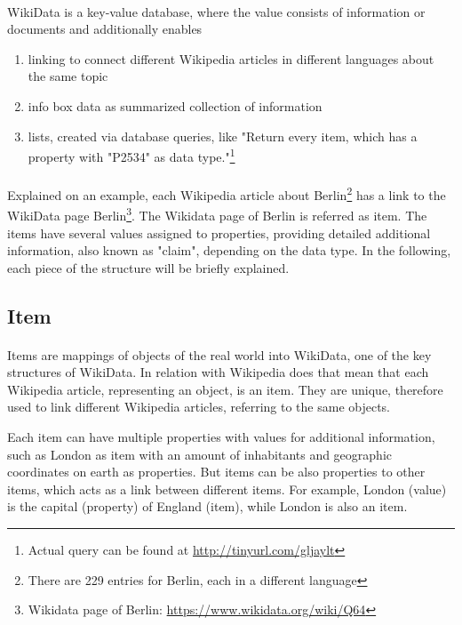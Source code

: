 \documentclass[12pt]{article}
\begin{document}
\paragraph{}
WikiData is a key-value database, where the value consists of information or documents and additionally enables
\begin{enumerate}
\item	linking to connect different Wikipedia articles in different languages about the same topic

\item	info box data as summarized collection of information

\item	lists, created via database queries, like "Return every item, which has a property with "P2534" as data type."\footnote{Actual query can be found at  \url{http://tinyurl.com/gljaylt}}
\end{enumerate}
\paragraph{}
Explained on an example, each Wikipedia article about Berlin\footnote{There are 229 entries for Berlin, each in a different language} has a link to the WikiData page Berlin\footnote{Wikidata page of Berlin: \url{https://www.wikidata.org/wiki/Q64}}. The Wikidata page of Berlin is referred as item. The items have several values assigned to properties, providing detailed additional information, also known as "claim", depending on the data type. In the following, each piece of the structure will be briefly explained.

\subsection{Item}
\paragraph{}
Items are mappings of objects of the real world into WikiData, one of the key structures of WikiData. In relation with Wikipedia does that mean that each Wikipedia article, representing an object, is an item. They are unique, therefore used to link different Wikipedia articles, referring to the same objects.

Each item can have multiple properties with values for additional information, such as London as item with an amount of inhabitants and geographic coordinates on earth as properties. But items can be also properties to other items, which acts as a link between different items. For example, London (value) is the capital (property) of England (item), while London is also an item.
\end{document}

